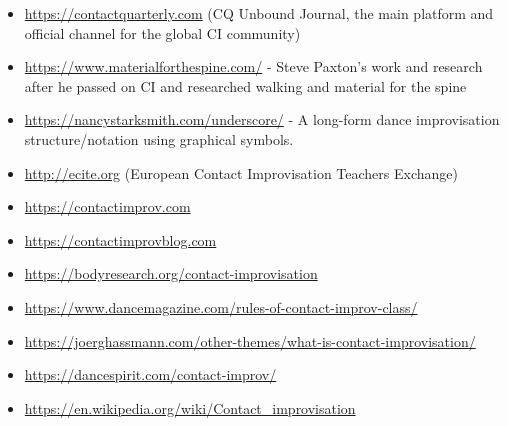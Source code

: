 \begin{itemize}
    \setlength\itemsep{0em}
    \item \url{https://contactquarterly.com} (CQ Unbound Journal, the main platform and official channel for the global CI community)
    \item \url{https://www.materialforthespine.com/} - Steve Paxton's work and research after he passed on CI and researched walking and material for the spine
    \item \url{https://nancystarksmith.com/underscore/} - A long-form dance improvisation structure/notation using graphical symbols.
    \item \url{http://ecite.org} (European Contact Improvisation Teachers Exchange)
    \item \url{https://contactimprov.com}
    \item \url{https://contactimprovblog.com}
    \item \url{https://bodyresearch.org/contact-improvisation}
    \item \url{https://www.dancemagazine.com/rules-of-contact-improv-class/}
    \item \url{https://joerghassmann.com/other-themes/what-is-contact-improvisation/}
    \item \url{https://dancespirit.com/contact-improv/}
    \item \url{https://en.wikipedia.org/wiki/Contact_improvisation}
\end{itemize}
